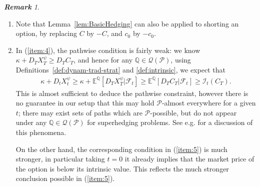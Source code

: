 \documentclass[a4paper]{amsart}
\theoremstyle{definition}
\theoremstyle{remark}
\newtheorem{remark}[theorem]{\textbf{Remark}}
\numberwithin{equation}{section}
\newcommand{\E}{\mathbb{E}}
\renewcommand{\P}{\mathbb{P}}
\newcommand{\Q}{\mathbb{Q}}
\newcommand{\eg}{e.g.}
\newcommand{\Fc}{\mathcal{F}}
\newcommand{\Eq}[1]{\E^{\Q}\left[#1\right]}
\newcommand{\Pc}{\mathcal{P}}
\newcommand{\Qc}{\mathcal{Q}}
\newcommand{\In}{\mathcal{I}} %
\begin{document}
\begin{remark}
  \begin{enumerate}
  \item[(a)] Note that Lemma~\ref{lem:BasicHedging} can also be applied to shorting an option, by replacing $C$ by $-C$, and $c_0$ by $-c_0$.
  \item[(b)] In (\ref{item:4}), the pathwise condition is fairly weak: we know $\kappa + D_T X_T^\psi \ge D_T C_T$, and hence for any $\Q \in \Qc(\Pc)$, using Definitions~\ref{def:dynam-trad-strat} and \ref{def:intrinsic}, we expect that
    \begin{align*}
      \kappa + D_t X_t^{\psi} \ge \kappa + \Eq{D_T X_T^{\psi}|\Fc_t} \ge  \Eq{D_T C_T|\Fc_t} \ge \In_t(C_T) .
    \end{align*}
    This is almost sufficient to deduce the pathwise constraint, however there is no guarantee in our setup that this may hold $\Pc$-almost everywhere for a given $t$; there may exist sets of paths which are $\Pc$-possible, but do not appear under any $\Q \in \Qc(\Pc)$ for superhedging problems. See \eg{} \cite{aksamit_robust_2020}  for a discussion of this phenomena.

    On the other hand, the corresponding condition in (\ref{item:5}) is much stronger, in particular taking $t=0$ it already implies that the market price of the option is below its intrinsic value. This reflects the much stronger conclusion possible in (\ref{item:5}).
    
  \end{enumerate}
      
\end{remark}

\end{document}
